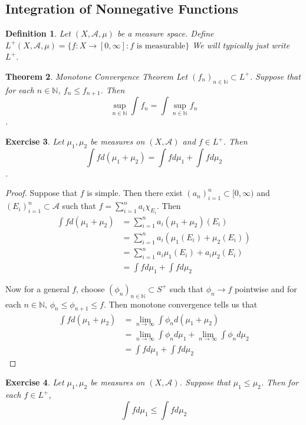 \documentclass[12pt]{amsart}
\newtheorem{thm}{Theorem}[section]
\newtheorem{defn}[thm]{Definition}
\newtheorem{ex}[thm]{Exercise}
\newcommand{\N}{\mathbb{N}}
\newcommand{\MA}{\mathcal{A}}
\newcommand{\RG}{[0,\infty]}
\newcommand{\Rg}{[0,\infty)}
\newcommand{\limn}{\lim \limits_{n \rightarrow \infty}}
\begin{document}
\subsection{Integration of Nonnegative Functions}

\begin{defn}
Let $(X, \MA, \mu)$ be a measure space. Define $L^{+}(X, \MA, \mu) = \{f:X \rightarrow \RG : f \text{ is measurable}\}$ We will typically just write $L^{+}$.
\end{defn}

\begin{thm}{Monotone Convergence Theorem} 
Let $(f_n)_{n \in \N} \subset L^+$. Suppose that for each $n \in \N$, $f_n \leq f_{n+1}$. Then $$\sup_{n \in \N} \int f_n = \int \sup_{n \in \N} f_n$$.
\end{thm}

\begin{ex}
Let $\mu_1, \mu_2$ be measures on $(X, \MA)$ and $f \in L^+$. Then $$\int f d (\mu_1 + \mu_2) = \int f d\mu_1 + \int f d\mu_2$$.  
\end{ex}

\begin{proof}
Suppose that $f$ is simple. Then there exist $(a_n)_{i=1}^n \subset \Rg$ and $(E_i)_{i=1}^n \subset \MA$ such that $f = \sum\limits_{i =1}^n a_i \chi_{E_i}$. Then 
\begin{align*}
\int f d(\mu_1 + \mu_2) 
&= \sum\limits_{i =1}^n a_i (\mu_1 + \mu_2)(E_i)\\
&= \sum\limits_{i =1}^n a_i (\mu_1(E_i) + \mu_2(E_i))\\
&= \sum\limits_{i =1}^n a_i \mu_1(E_i) + a_i \mu_2(E_i)\\
&= \int f d\mu_1 + \int f d\mu_2
\end{align*}

Now for a general $f$, choose $(\phi_n)_{n \in \N} \subset S^+$ such that $\phi_n \rightarrow f$ pointwise and for each $n \in \N$, $\phi_n \leq \phi_{n+1} \leq f$. Then monotone convergence tells us that 
\begin{align*}
\int f d(\mu_1 + \mu_2) 
&= \limn \int \phi_n d(\mu_1 + \mu_2)\\
&= \limn \int \phi_n d \mu_1 + \limn \int \phi_n d \mu_2 \\
&= \int f d \mu_1 + \int f d \mu_2
\end{align*}

\end{proof}


\begin{ex}
Let $\mu_1, \mu_2$ be measures on $(X,\MA)$. Suppose that $\mu_1 \leq \mu_2$. Then for each $f \in L^+$, $$\int f d\mu_1 \leq \int f d\mu_2$$
\end{ex}
\end{document}
